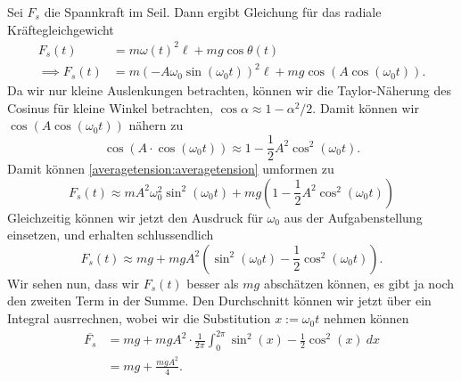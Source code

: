\begin{Answer}
	Sei $F_s$ die Spannkraft im Seil. Dann ergibt Gleichung für das radiale Kräftegleichgewicht
	\begin{align}\label{averagetension:averagetension}
		F_s(t) &= m\omega(t)^2\ell + mg\cos \theta(t)\nonumber \\
		\implies 
		F_s(t) &= m \left(-A\omega_0 \sin(\omega_0 t)\right)^2 \ell + mg \cos \left(A \cos (\omega_0 t)\right).
	\end{align}
	Da wir nur kleine Auslenkungen betrachten, können wir die Taylor-Näherung des Cosinus für kleine Winkel betrachten, $\cos \alpha \approx 1 - \alpha^2/2$. Damit können wir $\cos\left(A \cos (\omega_0t)\right)$ nähern zu
	\[
	\cos\left(A\cdot \cos(\omega_0t)\right) \approx 1 -\frac{1}{2} A^2 \cos^2(\omega_0 t).
	\]
	Damit können \eqref{averagetension:averagetension} umformen zu
	\[
	F_s(t) \approx mA^2\omega_0^2\sin^2(\omega_0t) + mg\left(1- \frac{1}{2}A^2 \cos^2(\omega_0t)\right)
	\]
	Gleichzeitig können wir jetzt den Ausdruck für $\omega_0$ aus der Aufgabenstellung einsetzen, und erhalten schlussendlich
	\[
	\boxed{F_s(t) \approx mg + mgA^2 \left( \sin^2(\omega_0 t) - \frac{1}{2}\cos^2(\omega_0 t)\right).}
	\]
	Wir sehen nun, dass wir $F_s(t)$ besser als $mg$ abschätzen können, es gibt ja noch den zweiten Term in der Summe. Den Durchschnitt können wir jetzt über ein Integral ausrrechnen, wobei wir die Substitution $x:= \omega_0t$ nehmen können
	\begin{align*}
	\overline{F_s} &= mg + mgA^2\cdot\frac{1}{2\pi} \int_{0}^{2\pi} \sin^2(x) - \frac{1}{2}\cos^2(x)~dx\\
	&\boxed{= mg + \frac{mgA^2}{4}.}
	\end{align*}
\end{Answer}
